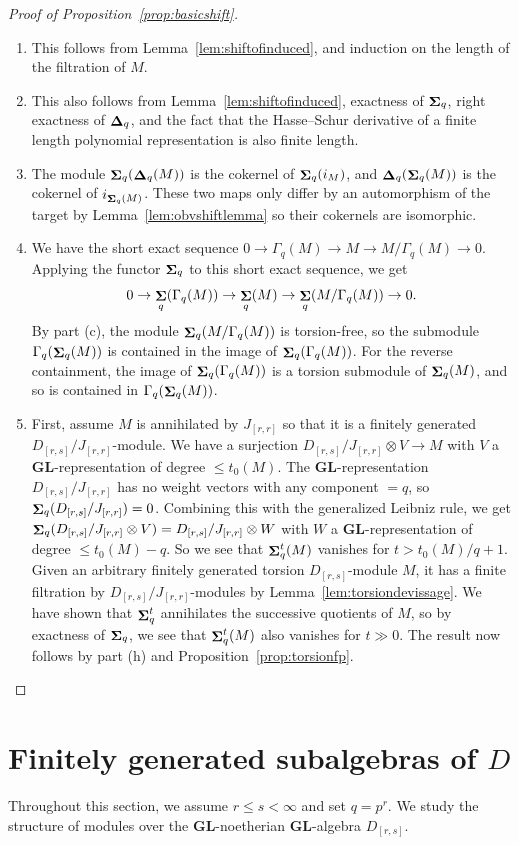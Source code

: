 \documentclass[12pt]{amsart}
\DeclareMathOperator{\Sh}{\bf{\Sigma}}
\DeclareMathOperator{\De}{\bf{\Delta}}
\newcommand{\Drs}{D_{[r,s]}}
\newcommand{\Jrr}{J_{[r,r]}}
\newcommand{\mShq}{\Sh_{q}}
\newcommand{\mDeq}{\De_{q}}
\newcommand{\GL}{\mathbf{GL}}
\newcommand{\mGaq}{\Gamma_{q}}
\numberwithin{equation}{section}
\theoremstyle{definition}
\theoremstyle{plain}
\begin{document}
\begin{proof}[Proof of Proposition~\ref{prop:basicshift}]
\begin{enumerate}[label=(\alph*), wide=2.1em]
    \item This follows from Lemma~\ref{lem:shiftofinduced}, and induction on the length of the filtration of $M$.
    \item This also follows from Lemma~\ref{lem:shiftofinduced}, exactness of $\mShq$, right exactness of $\mDeq$, and the fact that the Hasse--Schur derivative of a finite length polynomial representation is also finite length. 
    \item The module $\mShq(\mDeq(M))$ is the cokernel of $\mShq(i_M)$, and $\mDeq(\mShq(M))$ is the cokernel of $i_{\mShq(M)}$. These two maps only differ by an automorphism of the target by Lemma~\ref{lem:obvshiftlemma} so their cokernels are isomorphic.
    \item We have the short exact sequence $0 \to \mGaq(M) \to M \to M/\mGaq(M) \to 0$. Applying the functor $\mShq$ to this short exact sequence, we get 
    \begin{displaymath}
    0 \to \mShq(\mGaq(M)) \to \mShq(M) \to \mShq(M/\mGaq(M)) \to 0.
    \end{displaymath}
    By part (c), the module $\mShq(M/\mGaq(M))$ is torsion-free, so the submodule $\mGaq(\mShq(M))$ is contained in the image of $\mShq(\mGaq(M))$. For the reverse containment, the image of $\mShq(\mGaq(M))$ is a torsion submodule of $\mShq(M)$, and so is contained in $\mGaq(\mShq(M))$.
    \item First, assume $M$ is annihilated by $\Jrr$ so that it is a finitely generated $\Drs/\Jrr$-module. We have a surjection $\Drs/\Jrr \otimes V \to M$ with $V$ a $\GL$-representation of degree $\leq t_0(M)$. The $\GL$-representation $\Drs/\Jrr$ has no weight vectors with any component $= q$, so $\mShq(\Drs/\Jrr) = 0$. Combining this with the generalized Leibniz rule, we get $\mShq(\Drs/\Jrr \otimes V) = \Drs/\Jrr \otimes W$ with $W$ a $\GL$-representation of degree $\leq t_0(M) -q$. So we see that $\mShq^t(M)$ vanishes for $t > t_0(M)/q + 1$. Given an arbitrary finitely generated torsion $\Drs$-module $M$, it has a finite filtration by $\Drs/\Jrr$-modules by Lemma~\ref{lem:torsiondevissage}. We have shown that $\mShq^t$ annihilates the successive quotients of $M$, so by exactness of $\mShq$, we see that $\mShq^t(M)$ also vanishes for $t \gg 0$. The result now follows by part (h) and Proposition~\ref{prop:torsionfp}.
\end{enumerate} 
\end{proof}

\section{Finitely generated subalgebras of \texorpdfstring{$D$}{D}}\label{s:nagpalshift}
Throughout this section, we assume $r \leq s < \infty$ and set $q = p^r$. We study the structure of modules over the $\GL$-noetherian $\GL$-algebra $\Drs$.
\end{document}
